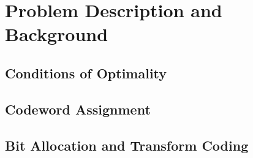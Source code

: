 \documentclass[10pt]{article}
\begin{document}
\section{Problem Description and Background}

\subsection{Conditions of Optimality}

\subsection{Codeword Assignment}

\subsection{Bit Allocation and Transform Coding}
\end{document}
